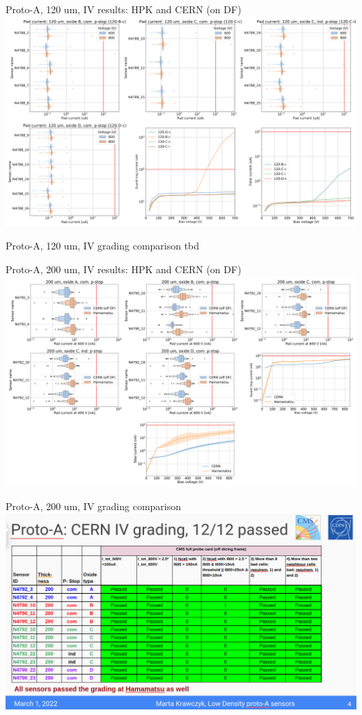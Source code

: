 \documentclass{beamer}
\begin{document}
\begin{frame}{Proto-A, 120 um, IV results: HPK and CERN (on DF)}
  \includegraphics[width=.8\textwidth]{plots/IV_CERN_HPK_120um.png}
\end{frame}

\begin{frame}{Proto-A, 120 um, IV grading comparison}
  tbd
\end{frame}

\begin{frame}{Proto-A, 200 um, IV results: HPK and CERN (on DF)}
  \includegraphics[width=.8\textwidth]{plots/IV_Comparison_SensorsHPK_200um.png}
\end{frame}

\begin{frame}{Proto-A, 200 um, IV grading comparison}
  \includegraphics[width=.8\textwidth]{plots/IV_CERN_HPK_200um.png}
\end{frame}
\end{document}
